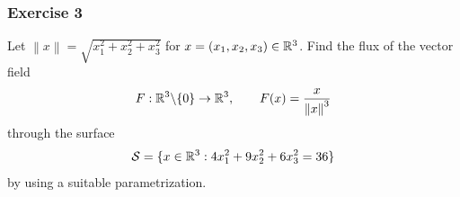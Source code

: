 \documentclass[10pt, t, allowdisplaybreaks]{beamer}
\begin{document}
\begin{frame}
    \frametitle{Exercise 3}
    \par Let $\left\lVert x\right\rVert = \sqrt{x_1^2+x_2^2+x_3^2}$ for $x = (x_1, x_2, x_3) \in \mathbb{R}^3$. Find the flux of the vector field
    \begin{equation*}
        F:\mathbb{R}^3\backslash\{0\}\rightarrow\mathbb{R}^3, \qquad F(x) = \frac{x}{\left\lVert x\right\rVert^3 }
    \end{equation*}
    through the surface 
    \begin{equation*}
        \mathcal{S} = \{x\in \mathbb{R}^3: 4x_1^2 + 9x_2^2 + 6x_3^2 = 36\}
    \end{equation*}
    by using a suitable parametrization.
\end{frame}
\end{document}
